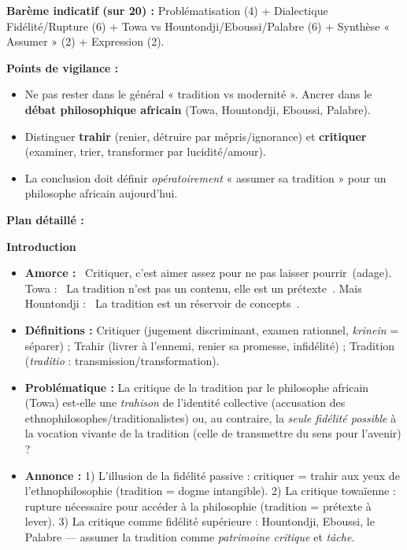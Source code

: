 \documentclass[11pt]{article}
\begin{document}
\begin{corrige}
\textbf{Barème indicatif (sur 20) :} Problématisation (4) + Dialectique Fidélité/Rupture (6) + Towa vs Hountondji/Eboussi/Palabre (6) + Synthèse « Assumer » (2) + Expression (2).

\textbf{Points de vigilance :}
\begin{itemize}
\item Ne pas rester dans le général « tradition vs modernité ». Ancrer dans le \textbf{débat philosophique africain} (Towa, Hountondji, Eboussi, Palabre).
\item Distinguer \textbf{trahir} (renier, détruire par mépris/ignorance) et \textbf{critiquer} (examiner, trier, transformer par lucidité/amour).
\item La conclusion doit définir \emph{opératoirement} « assumer sa tradition » pour un philosophe africain aujourd'hui.
\end{itemize}

\textbf{Plan détaillé :}

\textbf{Introduction}
\begin{itemize}
\item \textbf{Amorce :} \guillemotleft~Critiquer, c'est aimer assez pour ne pas laisser pourrir~\guillemotright (adage). Towa : \guillemotleft~La tradition n'est pas un contenu, elle est un prétexte~\guillemotright. Mais Hountondji : \guillemotleft~La tradition est un réservoir de concepts~\guillemotright.
\item \textbf{Définitions :} Critiquer (jugement discriminant, examen rationnel, \emph{krinein} = séparer) ; Trahir (livrer à l'ennemi, renier sa promesse, infidélité) ; Tradition (\emph{traditio} : transmission/transformation).
\item \textbf{Problématique :} La critique de la tradition par le philosophe africain (Towa) est-elle une \emph{trahison} de l'identité collective (accusation des ethnophilosophes/traditionalistes) ou, au contraire, la \emph{seule fidélité possible} à la vocation vivante de la tradition (celle de transmettre du sens pour l'avenir) ?
\item \textbf{Annonce :} 1) L'illusion de la fidélité passive : critiquer = trahir aux yeux de l'ethnophilosophie (tradition = dogme intangible). 2) La critique towaïenne : rupture nécessaire pour accéder à la philosophie (tradition = prétexte à lever). 3) La critique comme fidélité supérieure : Hountondji, Eboussi, le Palabre — assumer la tradition comme \emph{patrimoine critique} et \emph{tâche}.
\end{itemize}


\end{corrige}
\end{document}
